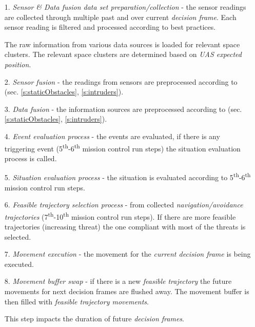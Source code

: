 \begin{itemize}
    \item[1.] \emph{Sensor \& Data fusion data set preparation/collection} - the sensor readings are collected through multiple past and over current \emph{decision frame}. Each sensor reading is filtered and processed according to best practices. 
    
    The raw information from various data sources is loaded for relevant space clusters. The relevant space clusters are determined based on \emph{UAS expected position}. 
    
    \item[2.] \emph{Sensor fusion} - the readings from sensors are preprocessed according to (sec. \ref{s:staticObstacles}, \ref{s:intruders}).
    
    \item[3.] \emph{Data fusion} - the information sources are preprocessed according to (sec. \ref{s:staticObstacles}, \ref{s:intruders}).
    
    \item[4.] \emph{Event evaluation process} - the events are evaluated, if there is any triggering event (5\textsuperscript{th}-6\textsuperscript{th} mission control run steps) the situation evaluation process is called.
    
    \item[5.] \emph{Situation evaluation process} - the situation is evaluated according to 5\textsuperscript{th}-6\textsuperscript{th} mission control run steps.
    
    \item[6.] \emph{Feasible trajectory selection process} - from collected \emph{navigation/avoidance trajectories} (7\textsuperscript{th}-10\textsuperscript{th} mission control run steps). If there are more feasible trajectories (increasing threat) the one compliant with most of the threats is selected.
    
    \item[7.] \emph{Movement execution} - the movement for the \emph{current decision frame} is being executed.
    
    \item[8.] \emph{Movement buffer swap} - if there is a new \emph{feasible trajectory} the future movements for next decision frames are flushed away. The movement buffer is then filled with \emph{feasible trajectory movements}.
    \begin{note}
        This step impacts the duration of future \emph{decision frames}.
    \end{note}
\end{itemize}
